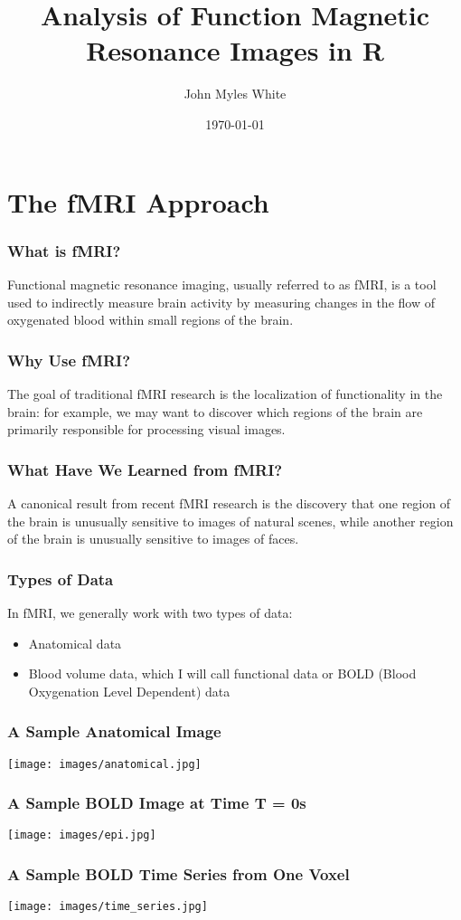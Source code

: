 \documentclass{beamer}
\title{Analysis of Function Magnetic Resonance Images in R}
\author{John Myles White}
\date{\today}
\begin{document}
\frame{\titlepage}

\section{The fMRI Approach}

\frame
{
	\frametitle{What is fMRI?}
	
	Functional magnetic resonance imaging, usually referred to as fMRI, is a tool used to indirectly measure brain activity by measuring changes in the flow of oxygenated blood within small regions of the brain.
}

\frame
{
	\frametitle{Why Use fMRI?}

	The goal of traditional fMRI research is the localization of functionality in the brain: for example, we may want to discover which regions  of the brain are primarily responsible for processing visual images.
}

\frame
{
	\frametitle{What Have We Learned from fMRI?}

	A canonical result from recent fMRI research is the discovery that one region of the brain is unusually sensitive to images of natural scenes, while another region of the brain is unusually sensitive to images of faces.
}

\frame
{
	\frametitle{Types of Data}
	
	In fMRI, we generally work with two types of data:
	
	\begin{itemize}
		\item{Anatomical data}
		\item{Blood volume data, which I will call functional data or BOLD (Blood Oxygenation Level Dependent) data}
	\end{itemize}
}

\frame
{
	\frametitle{A Sample Anatomical Image}
  
	\begin{center}
		\texttt{[image: images/anatomical.jpg]}
	\end{center}
}	

\frame
{
	\frametitle{A Sample BOLD Image at Time T = 0s}
  
	\begin{center}
 		\texttt{[image: images/epi.jpg]}
	\end{center}
}

\frame
{
	\frametitle{A Sample BOLD Time Series from One Voxel}
  
	\begin{center}
		\texttt{[image: images/time\_series.jpg]}
	\end{center}
}
\end{document}
